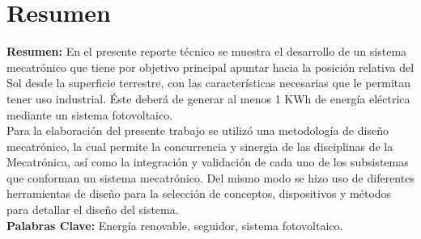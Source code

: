 \chapter{Resumen}


\textbf{Resumen:} En el presente reporte técnico se muestra el desarrollo de un sistema mecatrónico que tiene por objetivo principal apuntar hacia la posición relativa del Sol desde la superficie terrestre, con las características necesarias que le permitan tener uso industrial. Éste deberá de generar al menos 1 KWh de energía eléctrica mediante un sistema fotovoltaico.\\

Para la elaboración del presente trabajo se utilizó una metodología de diseño mecatrónico, la cual permite la concurrencia y sinergia de las disciplinas de la Mecatrónica, así como la integración y validación de cada uno de los subsistemas que conforman un sistema mecatrónico. Del mismo modo se hizo uso de diferentes herramientas de diseño para la selección de conceptos, dispositivos y métodos para detallar el diseño del sistema.\\


\textbf{Palabras Clave:} Energía renovable, seguidor, sistema fotovoltaico. \\



\endinput